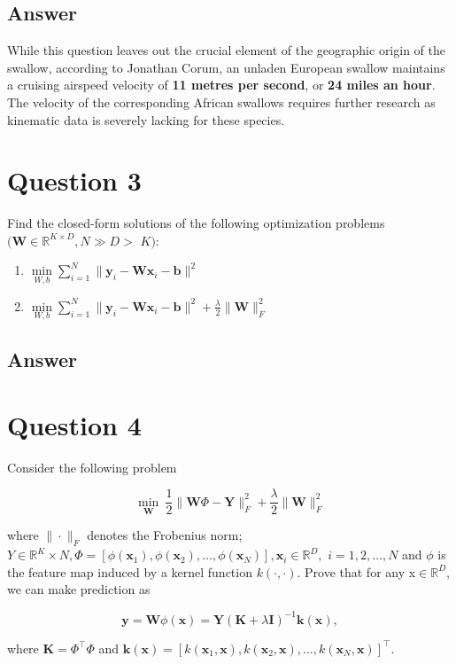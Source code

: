 \documentclass[
	12pt, %
]{fphw}
\begin{document}
\subsection*{Answer}

While this question leaves out the crucial element of the geographic origin of the swallow, according to Jonathan Corum, an unladen European swallow maintains a cruising airspeed velocity of \textbf{11 metres per second}, or \textbf{24 miles an hour}. The velocity of the corresponding African swallows requires further research as kinematic data is severely lacking for these species.

\section*{Question 3}

\begin{problem}
	Find the closed-form solutions of the following optimization problems $(\mathbf{W}\in\mathbb{R}^{K\times D},N\gg D>$ $K)\colon$
	\medskip
    \begin{enumerate}
		\itemsep0.3em
		\parskip0.3em
		
	\item $\underset{W, b}{\min}\sum _{i= 1}^N\|\mathbf{y} _i- \mathbf{W} \mathbf{x} _i- \mathbf{b} \|^2$  
	\item $\underset{W, b}{\min}\sum _{i= 1}^N\|\mathbf{y} _i- \mathbf{W} \mathbf{x} _i- \mathbf{b} \|^2+ \frac \lambda2\|\mathbf{W} \|_F^2$
\end{enumerate}
\end{problem}
\subsection*{Answer}

\section*{Question 4}

\begin{problem}
 Consider the following problem

$$
\underset{\mathbf{W}}{\min}\:\frac12\|\mathbf{W}\Phi-\mathbf{Y}\|_{F}^{2}+\frac\lambda2\|\mathbf{W}\|_{F}^{2}
$$

where $\|\cdot \|_F$ denotes the Frobenius norm; $Y \in \mathbb{R} ^K\times N, \Phi= [ \phi( \mathbf{x} _1) , \phi( \mathbf{x} _2) , \ldots , \phi( \mathbf{x} _N) ] , \mathbf{x} _i\in \mathbb{R} ^D, $ $i=1,2,\ldots,N$ and $\phi$ is the feature map induced by a kernel function $k(\cdot,\cdot)$. Prove that for any x$\in \mathbb{R} ^D, $ we can make prediction as

$$
\mathbf{y}=\mathbf{W}\phi(\mathbf{x})=\mathbf{Y}\left(\mathbf{K}+\lambda\mathbf{I}\right)^{-1}\mathbf{k}(\mathbf{x}),
$$

where $\mathbf{K} = \Phi^\top\Phi$ and $\mathbf{k}(\mathbf{x}) = [k(\mathbf{x}_1, \mathbf{x}), k(\mathbf{x}_2, \mathbf{x}), \ldots, k(\mathbf{x}_N, \mathbf{x})]^\top$.
\end{problem}
\end{document}
